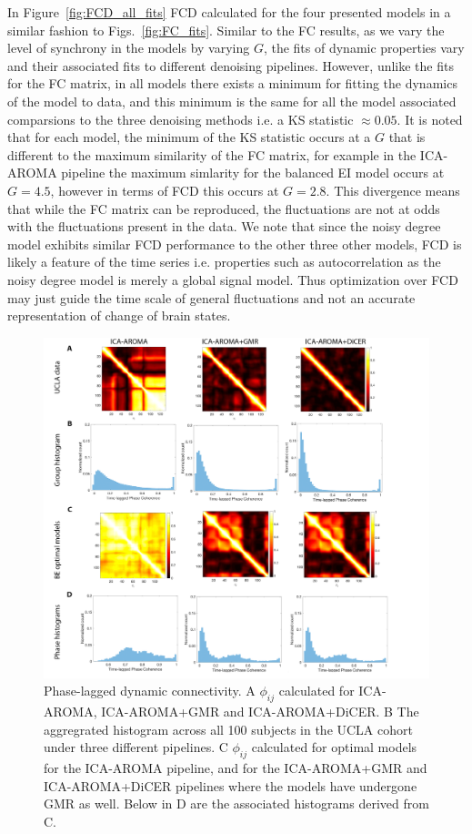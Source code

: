 \documentclass[oneside]{zHenriquesLab-StyleBioRxiv}
\begin{document}
In Figure~\ref{fig:FCD_all_fits} FCD calculated for the four presented models in a similar fashion to Figs.~\ref{fig:FC_fits}. Similar to the FC results, as we vary the level of synchrony in the models by varying $G$, the fits of dynamic properties vary and their associated fits to different denoising pipelines. However, unlike the fits for the FC matrix, in all models there exists a minimum for fitting the dynamics of the model to data, and this minimum is the same for all the model associated comparsions to the three denoising methods i.e. a KS statistic $\approx 0.05$. It is noted that for each model, the minimum of the KS statistic occurs at a $G$ that is different to the maximum similarity of the FC matrix, for example in the ICA-AROMA pipeline the maximum simlarity for the balanced EI model occurs at $G=4.5$, however in terms of FCD this occurs at $G=2.8$. This divergence means that while the FC matrix can be reproduced, the fluctuations are not at odds with the fluctuations present in the data. We note that since the noisy degree model exhibits similar FCD performance to the other three other models, FCD is likely a feature of the time series i.e. properties such as autocorrelation as the noisy degree model is merely a global signal model. Thus optimization over FCD may just guide the time scale of general fluctuations and not an accurate representation of change of brain states.

\begin{figure}[ht!]
\includegraphics[width=1\textwidth]{figs/FCD_BEI_data.png}
\caption{Phase-lagged dynamic connectivity. A $\phi_{ij}$ calculated for ICA-AROMA, ICA-AROMA+GMR and ICA-AROMA+DiCER. B The aggregrated histogram across all 100 subjects in the UCLA cohort under three different pipelines. C $\phi_{ij}$ calculated for optimal models for the ICA-AROMA pipeline, and for the ICA-AROMA+GMR and ICA-AROMA+DiCER pipelines where the models have undergone GMR as well. Below in D are the associated histograms derived from C.}\label{fig:FCD_model_BEI}
\end{figure}
\end{document}
